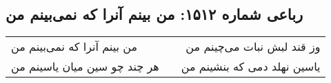 \begin{center}
\section*{رباعی شماره ۱۵۱۲: من بینم آنرا که نمی‌بینم من}
\label{sec:1512}
\begin{longtable}{l p{0.5cm} r}
من بینم آنرا که نمی‌بینم من
&&
وز قند لبش نبات می‌چینم من
\\
هر چند چو سین میان یاسینم من
&&
یاسین نهلد دمی که بنشینم من
\\
\end{longtable}
\end{center}
